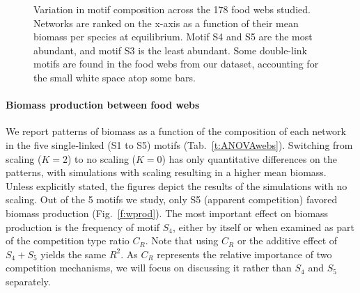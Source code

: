 \documentclass[12pt]{article}
\begin{document}
\begin{figure}[tbp]
   \centering
   \caption{Variation in motif composition across the 178 food webs studied. Networks are ranked on the x-axis as a function of their mean biomass per species at equilibrium. Motif S4 and S5 are the most abundant, and motif S3 is the least abundant. Some double-link motifs are found in the food webs from our dataset, accounting for the small white space atop some bars.}
   \label{f:motifs}
\end{figure}

\paragraph{Biomass production between food webs}

We report patterns of biomass as a function of the composition of each network
in the five single-linked (S1 to S5) motifs (Tab.~\ref{t:ANOVAwebs}). Switching
from scaling ($K = 2$) to no scaling ($K = 0$) has only quantitative differences
on the patterns, with simulations with scaling resulting in a higher mean
biomass. Unless explicitly stated, the figures depict the results of the
simulations with no scaling. Out of the 5 motifs we study, only S5 (apparent
competition) favored biomass production (Fig.~\ref{f:wprod}). The most important
effect on biomass production is the frequency of motif $S_{4}$, either by itself
or when examined as part of the competition type ratio $C_{R}$. Note that using
$C_{R}$ or the additive effect of $S_{4}+S_{5}$ yields the same $R^{2}$. As
$C_{R}$ represents the relative importance of two competition mechanisms, we
will focus on discussing it rather than $S_{4}$ and $S_{5}$ separately.
\end{document}
